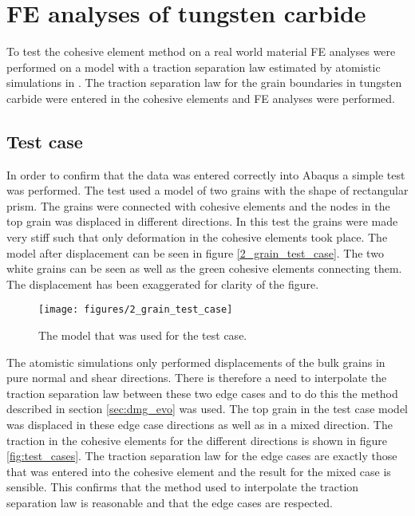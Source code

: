 \documentclass[wcco.tex]{subfiles}
\begin{document}
\FloatBarrier


\section{FE analyses of tungsten carbide}

To test the cohesive element method on a real world material FE analyses were performed on a model with a traction separation law estimated by atomistic simulations in \cite{Gren2013}. The traction separation law for the grain boundaries in tungsten carbide were entered in the cohesive elements and FE analyses were performed.
 
\subsection{Test case} 
  In order to confirm that the data was entered correctly into Abaqus a simple test was performed. The test used a model of two grains with the shape of rectangular prism. The grains were connected with cohesive elements and the nodes in the top grain was displaced in different directions. In this test the grains were made very stiff such that only deformation in the cohesive elements took place. The model after displacement can be seen in figure \ref{2_grain_test_case}. The two white grains can be seen as well as the green cohesive elements connecting them. The displacement has been exaggerated for clarity of the figure.

\begin{figure}[ht]
\centering
\texttt{[image: figures/2\_grain\_test\_case]}
\caption{The model that was used for the test case.}
\label{fig:2_grain_test_case}
\end{figure}

The atomistic simulations only performed displacements of the bulk grains in pure normal and shear directions. There is therefore a need to interpolate the traction separation law between these two edge cases and to do this the method described in section \ref{sec:dmg_evo} was used. The top grain in the test case model was displaced in these edge case directions as well as in a mixed direction. The traction in the cohesive elements for the different directions is shown in figure \ref{fig:test_cases}. The traction separation law for the edge cases are exactly those that was entered into the cohesive element and the result for the mixed case is sensible. This confirms that the method used to interpolate the traction separation law is reasonable and that the edge cases are respected.
\end{document}

